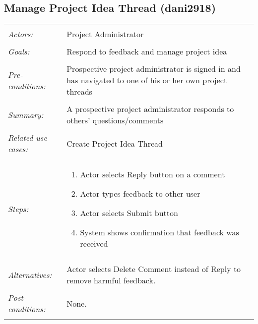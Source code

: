 \documentclass[11pt]{report}
\begin{document}
\subsection{Manage Project Idea Thread (dani2918)}
\begin{tabular}{ p{2cm} p{12cm} }
 \hline
 \\
 \textit{Actors:} & Project Administrator \\ 
 \\
 \textit{Goals:} & Respond to feedback and manage project idea  \\
 \\
 \textit{Pre-conditions:} & Prospective project administrator is signed in and has navigated to one of his or her own project threads  \\
 \\
 \textit{Summary:} &  A prospective project administrator responds to others' questions/comments \\ 
 \\
 \textit{Related use cases:} & Create Project Idea Thread \\ 
 \\
 \textit{Steps:} & \begin{enumerate}
  \item Actor selects Reply button on a comment
  \item Actor types feedback to other user
  \item Actor selects Submit button 
  \item System shows confirmation that feedback was received 
  
 \end{enumerate} \\
 \\
 \textit{Alternatives:} & Actor selects Delete Comment instead of Reply to remove harmful feedback. \\
 \\
 \textit{Post-conditions:} & None. \\
 \\
\hline
\end{tabular}
\end{document}
